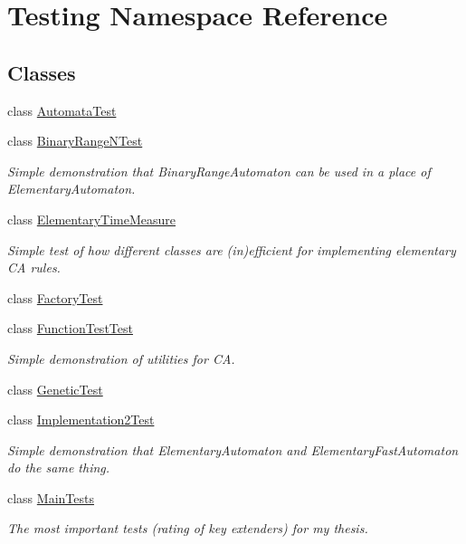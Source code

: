 \hypertarget{namespace_testing}{}\section{Testing Namespace Reference}
\label{namespace_testing}
\subsection*{Classes}
\begin{DoxyCompactItemize}
\item 
class \hyperlink{class_testing_1_1_automata_test}{Automata\+Test}
\item 
class \hyperlink{class_testing_1_1_binary_range_n_test}{Binary\+Range\+N\+Test}
\begin{DoxyCompactList}\small\item\em Simple demonstration that {\ttfamily Binary\+Range\+Automaton} can be used in a place of {\ttfamily Elementary\+Automaton}. \end{DoxyCompactList}\item 
class \hyperlink{class_testing_1_1_elementary_time_measure}{Elementary\+Time\+Measure}
\begin{DoxyCompactList}\small\item\em Simple test of how different classes are (in)efficient for implementing elementary C\+A rules. \end{DoxyCompactList}\item 
class \hyperlink{class_testing_1_1_factory_test}{Factory\+Test}
\item 
class \hyperlink{class_testing_1_1_function_test_test}{Function\+Test\+Test}
\begin{DoxyCompactList}\small\item\em Simple demonstration of utilities for C\+A. \end{DoxyCompactList}\item 
class \hyperlink{class_testing_1_1_genetic_test}{Genetic\+Test}
\item 
class \hyperlink{class_testing_1_1_implementation2_test}{Implementation2\+Test}
\begin{DoxyCompactList}\small\item\em Simple demonstration that {\ttfamily Elementary\+Automaton} and {\ttfamily Elementary\+Fast\+Automaton} do the same thing. \end{DoxyCompactList}\item 
class \hyperlink{class_testing_1_1_main_tests}{Main\+Tests}
\begin{DoxyCompactList}\small\item\em The most important tests (rating of key extenders) for my thesis. \end{DoxyCompactList}\item 

\end{DoxyCompactItemize}
